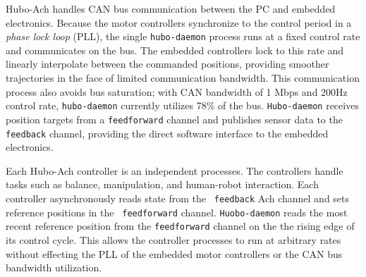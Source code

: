 Hubo-Ach handles CAN bus communication between the PC and embedded
electronics.  Because the motor controllers synchronize to the control
period in a \emph{phase lock loop} (PLL), the single {\tt hubo-daemon}
process runs at a fixed control rate and communicates on the bus.  The
embedded controllers lock to this rate and linearly interpolate
between the commanded positions, providing smoother trajectories in
the face of limited communication bandwidth.  This communication
process also avoids bus saturation; with CAN bandwidth of 1 Mbps and
200Hz control rate, {\tt hubo-daemon} currently utilizes 78\% of the
bus.  {\tt Hubo-daemon} receives position targets from a
{\tt feedforward} channel and publishes sensor data to the
{\tt feedback} channel, providing the direct software interface to
the embedded electronics.



Each Hubo-Ach controller is an independent processes.  The controllers
handle tasks such as balance, manipulation, and human-robot
interaction.  Each controller asynchronously reads state from the {\tt
  feedback} Ach channel and sets reference positions in the {\tt
  feedforward} channel.  {\tt Huobo-daemon} reads the most recent
reference position from the {\tt feedforward} channel on the the
rising edge of its control cycle.  This allows the controller
processes to run at arbitrary rates without effecting the PLL of the
embedded motor controllers or the CAN bus bandwidth utilization.

